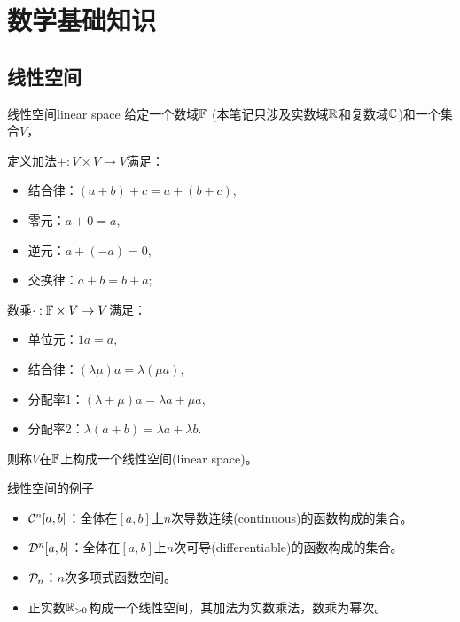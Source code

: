 \chapter{数学基础知识}
\label{chap:math basics}

\section{线性空间}
\label{sec:linear space}

\begin{definition}
    {线性空间}{linear space}
    给定一个数域$\mathbb F$ (本笔记只涉及实数域$\mathbb R$和复数域$\mathbb C$)和一个集合$V$，
    
    定义加法$+:V\times V\to V$满足：
    \begin{itemize}
        \item 结合律：$(a+b)+c=a+(b+c),$
        \item 零元：$a+0=a,$
        \item 逆元：$a+(-a)=0,$
        \item 交换律：$a+b=b+a;$
    \end{itemize}
    数乘$\cdot:\mathbb F\times V\to V$满足：
    \begin{itemize}
        \item 单位元：$1a=a,$
        \item 结合律：$(\lambda\mu)a=\lambda(\mu a),$
        \item 分配率1：$(\lambda+\mu)a=\lambda a+\mu a,$
        \item 分配率2：$\lambda(a+b)=\lambda a+\lambda b.$
    \end{itemize}
    则称$V$在$\mathbb F$上构成一个线性空间(linear space)。
\end{definition}

\begin{example}
    {线性空间的例子}{}
    \begin{itemize}
        \item $\mathcal C^n[a,b]$：全体在$[a,b]$上$n$次导数连续(continuous)的函数构成的集合。
        \item $\mathcal D^n[a,b]$：全体在$[a,b]$上$n$次可导(differentiable)的函数构成的集合。
        \item $\mathcal P_n$：$n$次多项式函数空间。
        \item 正实数$\mathbb R_{>0}$构成一个线性空间，其加法为实数乘法，数乘为幂次。
    \end{itemize}
\end{example}


